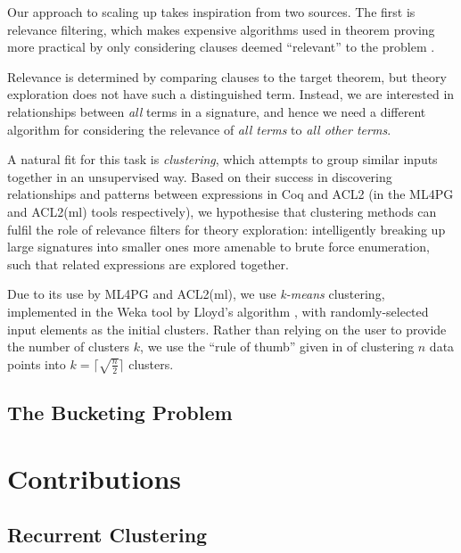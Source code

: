 Our approach to scaling up \qspec{} takes inspiration from two sources. The
first is relevance filtering, which makes expensive algorithms used in theorem
proving more practical by only considering clauses deemed ``relevant'' to the
problem \cite{meng2009lightweight}.

Relevance is determined by comparing clauses to the target theorem, but theory
exploration does not have such a distinguished term. Instead, we are interested
in relationships between \emph{all} terms in a signature, and hence we need a
different algorithm for considering the relevance of \emph{all terms} to
\emph{all other terms}.

A natural fit for this task is \emph{clustering}, which attempts to group
similar inputs together in an unsupervised way. Based on their success in
discovering relationships and patterns between expressions in Coq and ACL2 (in
the ML4PG and ACL2(ml) tools respectively), we hypothesise that clustering
methods can fulfil the role of relevance filters for theory exploration:
intelligently breaking up large signatures into smaller ones more amenable to
brute force enumeration, such that related expressions are explored together.

Due to its use by ML4PG and ACL2(ml), we use \emph{k-means} clustering,
implemented in the Weka tool \cite{Holmes.Donkin.Witten:1994} by Lloyd's
algorithm \cite{lloyd1982least}, with randomly-selected input elements as the
initial clusters. Rather than relying on the user to provide the number of
clusters $k$, we use the ``rule of thumb'' given in
\cite[pp. 365]{mardia1979multivariate} of clustering $n$ data points into
$k = \lceil \sqrt{\frac{n}{2}} \rceil$ clusters.

\subsection{The Bucketing Problem}
\label{sec:bucketing}


\section{Contributions}
\label{sec:contributions}

\subsection{Recurrent Clustering}
\label{sec:recurrentclustering}

